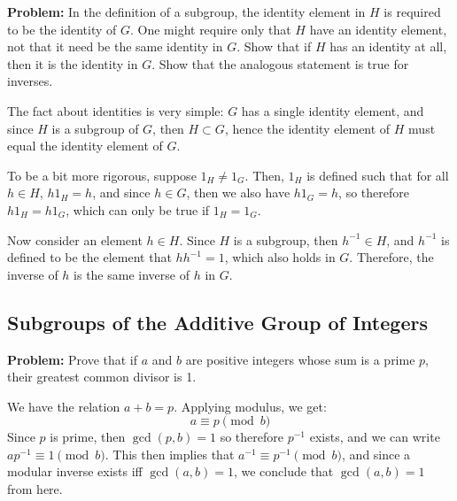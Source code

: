 \documentclass[10pt]{article}
\newenvironment{problem}{\textbf{Problem:}}{}
\begin{document}
\begin{problem}
	In the definition of a subgroup, the identity element in \( H \) is required 
	to be the identity of \( G \). One might require only that \( H \) have an identity 
	element, not that it need be the same identity in \( G \). Show that 
	if \( H \) has an identity at all, then it is the identity in \( G \). 
	Show that the analogous statement is true for inverses. 
\end{problem}

\begin{solution}
	The fact about identities is very simple: \( G \) has a single identity 
	element, and since \( H \) is a subgroup of \( G \), then \( H \subset G \), 
	hence the identity element of \( H \) must equal the identity element of \( G \).  

	To be a bit more rigorous, suppose \( 1_H \neq 1_G\). Then, \( 1_H \) is defined 
	such that for all \( h \in H \), \( h 1_H = h \), and since \( h \in G\), then 
	we also have \( h 1_G = h \), so therefore \( h 1_H = h 1_G \), which can 
	only be true if \( 1_H = 1_G \). 

	Now consider an element \( h \in H \). Since \( H \) is a subgroup, then 
	\( h^{-1} \in H \), and \( h^{-1} \) is defined to be the element 
	that \( hh^{-1} = 1 \), which also holds in \( G \). Therefore, 
	the inverse of \( h \) is the same inverse of \( h \) in \( G \).
\end{solution}

\subsection{Subgroups of the Additive Group of Integers}
\begin{problem}
	Prove that if \( a \) and \( b \) are positive integers whose sum is a prime 
	\( p \), their greatest common divisor is 1. 
\end{problem}

\begin{solution}
	We have the relation \( a + b = p \). Applying modulus, we get:
	\[
		a \equiv p \pmod b
	\] 
	Since \( p \) is prime, then \( \gcd(p, b) = 1 \) so therefore \( p^{-1} \)
	exists, and we can write \( ap ^{-1} \equiv 1 \pmod b \). This then 
	implies that \( a^{-1} \equiv p^{-1} \pmod b \), and since a modular inverse 
	exists iff \( \gcd(a, b) = 1 \), we conclude that \( \gcd(a, b) = 1 \) from 
	here. 
\end{solution}
\end{document}

